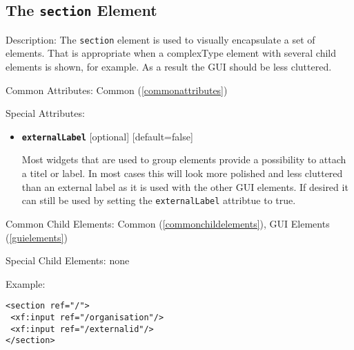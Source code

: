 \subsection{ The \texttt{section} Element}
\begin{description}
 \item Description: The \texttt{section} element is used to visually encapsulate a set of elements. That is appropriate when a complexType element with several child elements is shown, for example. As a result the GUI should be less cluttered.

 \item Common Attributes: Common (\ref{commonattributes})

 \item Special Attributes: 

\begin{itemize}
 \item \textbf{\texttt{externalLabel}} [optional] [default=false]

Most widgets that are used to group elements provide a possibility to attach a titel or label. In most cases this will look more polished and less cluttered than an external label as it is used with the other GUI elements. If desired it can still be used by setting the \texttt{externalLabel} attribtue to true.
\end{itemize}


 \item Common Child Elements: Common (\ref{commonchildelements}), GUI Elements (\ref{guielements})

 \item Special Child Elements: none

 \item Example: 

\begin{lstlisting}[caption=\texttt{section} Element]
<section ref="/">
 <xf:input ref="/organisation"/>
 <xf:input ref="/externalid"/>
</section>
\end{lstlisting}
\end{description}













